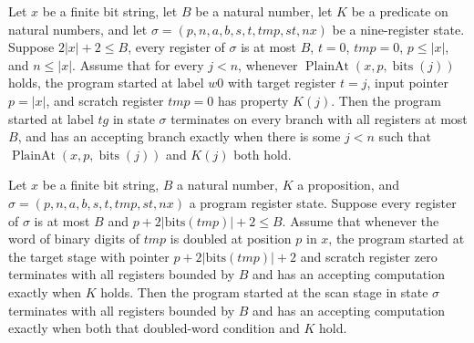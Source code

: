 \begin{lemma}
\label{Complexity.LogProg.ps_tphase}
\leanok
{}
Let $x$ be a finite bit string, let $B$ be a natural number, let $K$ be a predicate on
natural numbers, and let $\sigma=(p,n,a,b,s,t,tmp,st,nx)$ be a nine-register state.
Suppose $2|x|+2\le B$, every register of $\sigma$ is at most $B$, $t=0$, $tmp=0$, $p\le
|x|$, and $n\le |x|$. Assume that for every $j<n$, whenever
$\operatorname{PlainAt}(x,p,\operatorname{bits}(j))$ holds, the program started at label
$w0$ with target register $t=j$, input pointer $p=|x|$, and scratch register $tmp=0$ has
property $K(j)$. Then the program started at label $tg$ in state $\sigma$ terminates on
every branch with all registers at most $B$, and has an accepting branch exactly when
there is some $j<n$ such that $\operatorname{PlainAt}(x,p,\operatorname{bits}(j))$ and
$K(j)$ both hold.
\end{lemma}

\begin{lemma}
\label{Complexity.LogProg.ps_scmp}
\leanok
{}
Let $x$ be a finite bit string, $B$ a natural number, $K$ a proposition, and
$\sigma=(p,n,a,b,s,t,tmp,st,nx)$ a program register state. Suppose every register of $\sigma$ is
at most $B$ and $p+2|\mathrm{bits}(tmp)|+2\le B$. Assume that whenever the word of
binary digits of $tmp$ is doubled at position $p$ in $x$, the program started at the
target stage with pointer $p+2|\mathrm{bits}(tmp)|+2$ and scratch register zero
terminates with all registers bounded by $B$ and has an accepting computation exactly
when $K$ holds. Then the program started at the scan stage in state $\sigma$ terminates with
all registers bounded by $B$ and has an accepting computation exactly when both that
doubled-word condition and $K$ hold.
\end{lemma}

